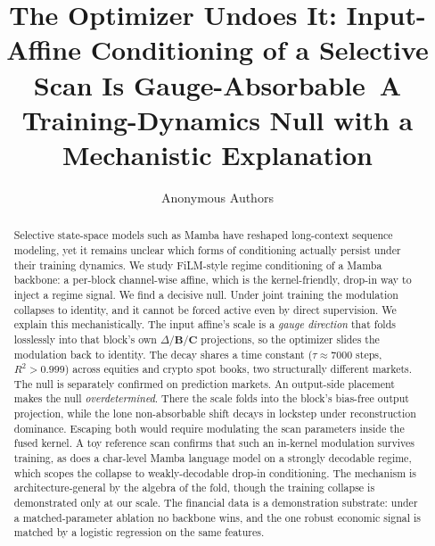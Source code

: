 \documentclass{article}
\title{The Optimizer Undoes It: Input-Affine Conditioning of a
Selective Scan Is Gauge-Absorbable\
\large \newline A Training-Dynamics Null with a Mechanistic Explanation}
\author{Anonymous Authors}
\begin{document}
\maketitle

\ifcolmsubmission
\linenumbers
\fi

\begin{abstract}
Selective state-space models such as Mamba have reshaped long-context sequence modeling, yet it remains unclear which forms of conditioning actually persist under their training dynamics. We study FiLM-style regime conditioning of a Mamba backbone: a per-block channel-wise affine, which is the kernel-friendly, drop-in way to inject a regime signal. We find a decisive null. Under joint training the modulation collapses to identity, and it cannot be forced active even by direct supervision. We explain this mechanistically. The input affine's scale is a \emph{gauge direction} that folds losslessly into that block's own $\Delta/\mathbf{B}/\mathbf{C}$ projections, so the optimizer slides the modulation back to identity. The decay shares a time constant ($\tau\approx7000$ steps, $R^2>0.999$) across equities and crypto spot books, two structurally different markets. The null is separately confirmed on prediction markets. An output-side placement makes the null \emph{overdetermined}. There the scale folds into the block's bias-free output projection, while the lone non-absorbable shift decays in lockstep under reconstruction dominance. Escaping both would require modulating the scan parameters inside the fused kernel. A toy reference scan confirms that such an in-kernel modulation survives training, as does a char-level Mamba language model on a strongly decodable regime, which scopes the collapse to weakly-decodable drop-in conditioning. The mechanism is architecture-general by the algebra of the fold, though the training collapse is demonstrated only at our scale. The financial data is a demonstration substrate: under a matched-parameter ablation no backbone wins, and the one robust economic signal is matched by a logistic regression on the same features.
\end{abstract}
\end{document}
